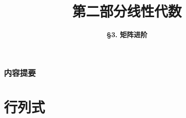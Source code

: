 



\title[Linear Algebra]{\LARGE \bfseries 第二部分\quad 线性代数} %
\author[More on Matrix] %
{\Large \bfseries \S 3. 矩阵进阶}
\date{}






\begin{frame}

\titlepage %

\end{frame}


\begin{frame}
\frametitle{内容提要} %
\tableofcontents %
\end{frame}


\section{行列式} %

